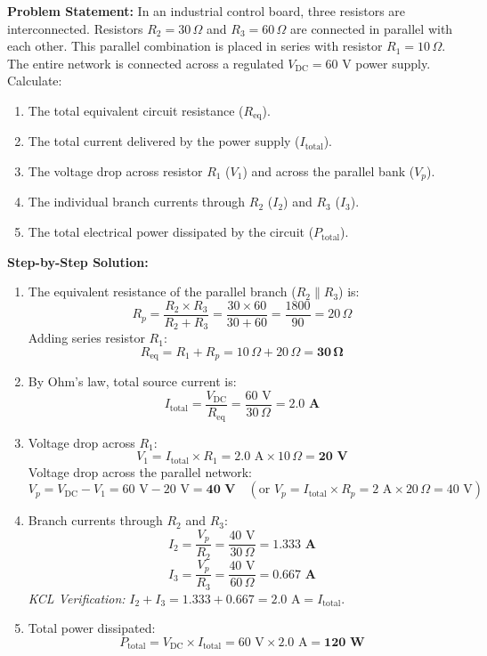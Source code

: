 \begin{tcolorbox}[colback=white,colframe=navyblue,title=\textbf{Problem 1: DC Series-Parallel Circuit Analysis and Power Dissipation}]
\textbf{Problem Statement:} In an industrial control board, three resistors are interconnected. Resistors $R_2 = 30\,\Omega$ and $R_3 = 60\,\Omega$ are connected in parallel with each other. This parallel combination is placed in series with resistor $R_1 = 10\,\Omega$. The entire network is connected across a regulated $V_{\text{DC}} = 60\text{ V}$ power supply. Calculate:
\begin{enumerate}[label=(\alph*),leftmargin=*]
    \item The total equivalent circuit resistance ($R_{\text{eq}}$).
    \item The total current delivered by the power supply ($I_{\text{total}}$).
    \item The voltage drop across resistor $R_1$ ($V_1$) and across the parallel bank ($V_p$).
    \item The individual branch currents through $R_2$ ($I_2$) and $R_3$ ($I_3$).
    \item The total electrical power dissipated by the circuit ($P_{\text{total}}$).
\end{enumerate}
\textbf{Step-by-Step Solution:}
\begin{enumerate}[label=(\alph*),leftmargin=*]
    \item The equivalent resistance of the parallel branch ($R_2 \parallel R_3$) is:
    \[
    R_p = \frac{R_2 \times R_3}{R_2 + R_3} = \frac{30 \times 60}{30 + 60} = \frac{1800}{90} = 20\,\Omega
    \]
    Adding series resistor $R_1$:
    \[
    R_{\text{eq}} = R_1 + R_p = 10\,\Omega + 20\,\Omega = \mathbf{30\,\Omega}
    \]
    \item By Ohm's law, total source current is:
    \[
    I_{\text{total}} = \frac{V_{\text{DC}}}{R_{\text{eq}}} = \frac{60\text{ V}}{30\,\Omega} = \mathbf{2.0\text{ A}}
    \]
    \item Voltage drop across $R_1$:
    \[
    V_1 = I_{\text{total}} \times R_1 = 2.0\text{ A} \times 10\,\Omega = \mathbf{20\text{ V}}
    \]
    Voltage drop across the parallel network:
    \[
    V_p = V_{\text{DC}} - V_1 = 60\text{ V} - 20\text{ V} = \mathbf{40\text{ V}} \quad (\text{or } V_p = I_{\text{total}} \times R_p = 2\text{ A} \times 20\,\Omega = 40\text{ V})
    \]
    \item Branch currents through $R_2$ and $R_3$:
    \[
    I_2 = \frac{V_p}{R_2} = \frac{40\text{ V}}{30\,\Omega} = \mathbf{1.333\text{ A}}
    \]
    \[
    I_3 = \frac{V_p}{R_3} = \frac{40\text{ V}}{60\,\Omega} = \mathbf{0.667\text{ A}}
    \]
    \textit{KCL Verification:} $I_2 + I_3 = 1.333 + 0.667 = 2.0\text{ A} = I_{\text{total}}$.
    \item Total power dissipated:
    \[
    P_{\text{total}} = V_{\text{DC}} \times I_{\text{total}} = 60\text{ V} \times 2.0\text{ A} = \mathbf{120\text{ W}}
    \]
\end{enumerate}
\end{tcolorbox}

